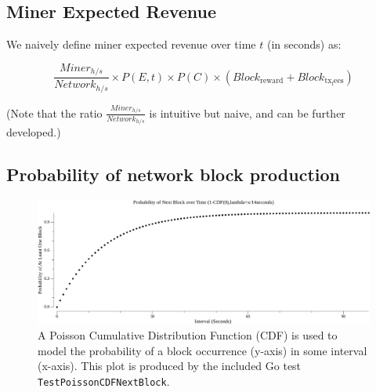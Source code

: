 \documentclass[11pt]{article}
\theoremstyle{plain}
\begin{document}
{\subsection{\normalsize{Miner Expected Revenue}}

We naively define miner expected revenue over time $t$ (in seconds) as:

\newcommand{\minerHashrate}{Miner_{h/s}}
\newcommand{\networkHashrate}{Network_{h/s}}
\newcommand{\blockReward}{Block_\mathrm{reward}}
\newcommand{\blockTransactionFees}{Block_\mathrm{tx_fees}}

\begin{equation}
\frac{\minerHashrate}{\networkHashrate}
\times
P(E,t)
\times
P(C)
\times
(\blockReward + \blockTransactionFees)
\end{equation}

(Note that the ratio $\frac{\minerHashrate}{\networkHashrate}$ is intuitive but
naive, and can be further developed.)

\subsection{\normalsize{Probability of network block production}}

\begin{figure}[htp]
    \label{go-block-step-cdf-interval}
    \centering
    \includegraphics[width=1.0\textwidth]{go-block-step/out/vis_poisson_cdf_next_in_interval.png}
    \caption{
        A Poisson Cumulative Distribution Function (CDF) is used to model the probability of a block
        occurrence (y-axis) in some interval (x-axis).
        This plot is produced by the included Go test \texttt{TestPoissonCDFNextBlock}.
    }
\end{figure}

}
\end{document}
